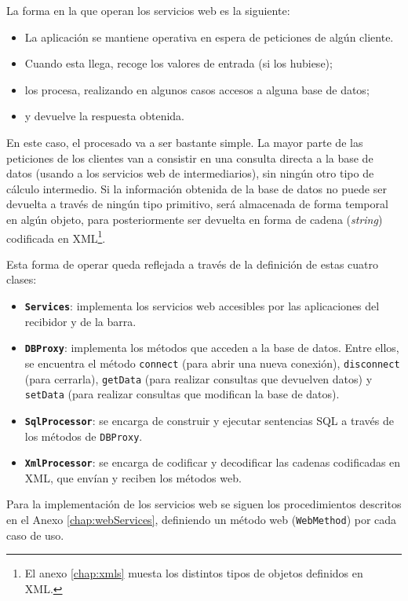 La forma en la que operan los servicios web es la siguiente:
\begin{itemize}
\item La aplicación se mantiene operativa en espera de peticiones de algún
cliente.
\item Cuando esta llega, recoge los valores de entrada (si los hubiese);
\item los procesa, realizando en algunos casos accesos a alguna base de datos;
\item y devuelve la respuesta obtenida.
\end{itemize}

En este caso, el procesado va a ser bastante simple. La mayor parte de las
peticiones de los clientes van a consistir en una consulta directa a la base
de datos (usando a los servicios web de intermediarios), sin ningún otro
tipo de cálculo intermedio. Si la información obtenida de la base de datos 
no puede ser devuelta a través de ningún tipo primitivo, será almacenada de 
forma temporal en algún objeto, para posteriormente ser devuelta en forma de
cadena (\emph{string}) codificada en \acs{XML}\footnote{El anexo
\ref{chap:xmls} muesta los distintos tipos de objetos definidos en \acs{XML}.}.

Esta forma de operar queda reflejada a través de la definición de estas cuatro 
clases:
\begin{itemize}
\item \textbf{\texttt{Services}}: implementa los servicios web accesibles por 
las aplicaciones del recibidor y de la barra.
\item \textbf{\texttt{DBProxy}}: implementa los métodos que acceden a la base 
de datos. Entre ellos, se encuentra el método \texttt{connect} (para abrir una 
nueva conexión), \texttt{disconnect} (para cerrarla), \texttt{getData} (para 
realizar consultas que devuelven datos) y \texttt{setData} (para realizar
consultas que modifican la base de datos).
\item \textbf{\texttt{SqlProcessor}}: se encarga de construir y ejecutar 
sentencias \acs{SQL} a través de los métodos de \texttt{DBProxy}.
\item \textbf{\texttt{XmlProcessor}}: se encarga de codificar y decodificar las 
cadenas codificadas en \acs{XML}, que envían y reciben los métodos web.
\end{itemize}

Para la implementación de los servicios web se siguen los procedimientos
descritos en el Anexo \ref{chap:webServices}, definiendo un método web
(\texttt{WebMethod}) por cada caso de uso.

